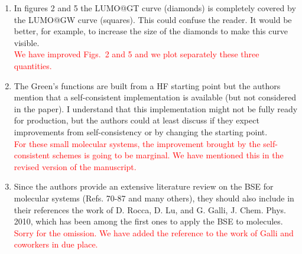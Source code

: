 \documentclass[10pt]{letter}
\newcommand{\alert}[1]{\textcolor{red}{#1}}
\begin{document}
\begin{letter}
\begin{enumerate}
\item 
{In figures 2 and 5 the LUMO@GT curve (diamonds) is completely covered by the LUMO@GW curve (squares). 
This could confuse the reader. 
It would be better, for example, to increase the size of the diamonds to make this curve visible.}
\\
\alert{
We have improved Figs.~2 and 5 and we plot separately these three quantities.
}

\item 
{The Green's functions are built from a HF starting point but the authors mention that a self-consistent implementation is available (but not considered in the paper). 
I understand that this implementation might not be fully ready for production, but the authors could at least discuss if they expect improvements from self-consistency or by changing the starting point.}
\\
\alert{
For these small molecular systems, the improvement brought by the self-consistent schemes is going to be marginal.
We have mentioned this in the revised version of the manuscript.
}

\item 
{Since the authors provide an extensive literature review on the BSE for molecular systems (Refs. 70-87 and many others), they should also include in their references the work of D. Rocca, D. Lu, and G. Galli, J. Chem. Phys. 2010, which has been among the first ones to apply the BSE to molecules. 
}
\\
\alert{
Sorry for the omission. 
We have added the reference to the work of Galli and coworkers in due place.
}

\end{enumerate}


\end{letter}
\end{document}
